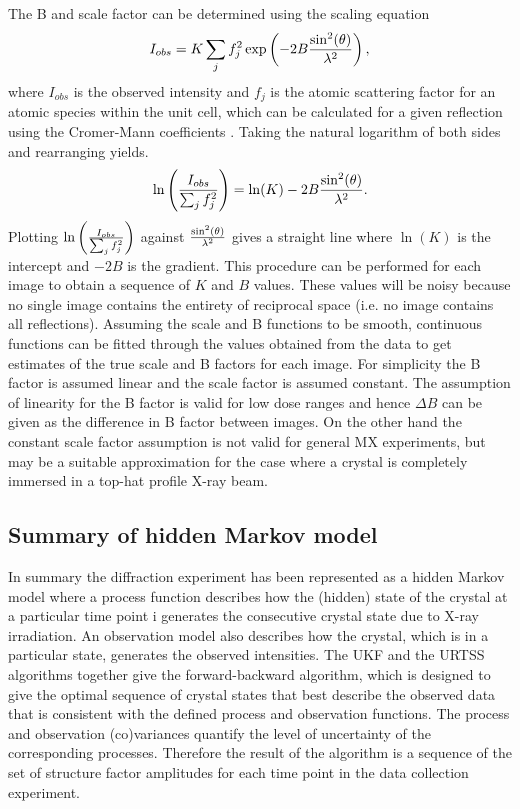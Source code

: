 The B and scale factor can be determined using the scaling equation
\begin{equation}
    I_{obs} = K \sum_j f_j^2 \exp\left(-2B \frac{\sin^2(\theta)}{\lambda^2}\right),
\end{equation}
where $I_{obs}$ is the observed intensity and $f_j$ is the atomic scattering factor for an atomic species within the unit cell, which can be calculated for a given reflection using the Cromer-Mann coefficients \cite{cromer1968x}.
Taking the natural logarithm of both sides and rearranging yields.
\begin{equation}
    \ln \left( \frac{I_{obs}}{\sum_j f_j^2}\right) = \ln(K) - 2B \frac{\sin^2(\theta)}{\lambda^2}.
\end{equation}
Plotting $\ln \left( \frac{I_{obs}}{\sum_j f_j^2}\right)$ against $ \frac{\sin^2(\theta)}{\lambda^2} $ gives a straight line where $\ln(K)$ is the intercept and $-2B$ is the gradient.
This procedure can be performed for each image to obtain a sequence of $K$ and $B$ values.
These values will be noisy because no single image contains the entirety of reciprocal space (i.e. no image contains all reflections).
Assuming the scale and B functions to be smooth, continuous functions can be fitted through the values obtained from the data to get estimates of the true scale and B factors for each image.
For simplicity the B factor is assumed linear and the scale factor is assumed constant.
The assumption of linearity for the B factor is valid for low dose ranges \cite{kmetko2006,borek2007many,leal2012} and hence $\Delta B$ can be given as the difference in B factor between images.
On the other hand the constant scale factor assumption is not valid for general MX experiments, but may be a suitable approximation for the case where a crystal is completely immersed in a top-hat profile X-ray beam.

\subsection{Summary of hidden Markov model}
\label{sub:Summary of hidden Markov model}
In summary the diffraction experiment has been represented as a hidden Markov model where a process function describes how the (hidden) state of the crystal at a particular time point i generates the consecutive crystal state due to X-ray irradiation.
An observation model also describes how the crystal, which is in a particular state, generates the observed intensities.
The UKF and the URTSS algorithms together give the forward-backward algorithm, which is designed to give the optimal sequence of crystal states that best describe the observed data that is consistent with the defined process and observation functions.
The process and observation (co)variances quantify the level of uncertainty of the corresponding processes.
Therefore the result of the algorithm is a sequence of the set of structure factor amplitudes for each time point in the data collection experiment.
